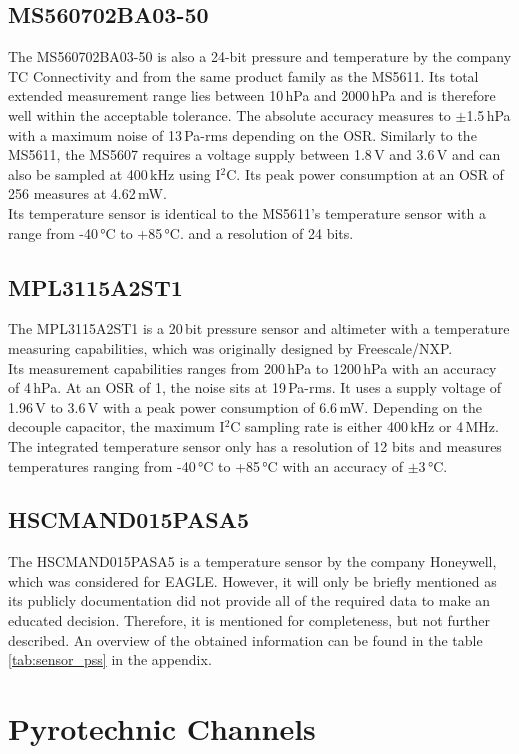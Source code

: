 \documentclass[fontsize=11pt,%
twoside,%
BCOR          = 8mm, %
DIV           = 11,  %
titlepage     = off,%
index=totoc,%
xcolor        = pdftex,%
dvipsnames,%
bibliography  = totoc,%
bibliography = numbered, %
listof        = notnumbered]{scrreprt}
\begin{document}
\subsection{MS560702BA03-50}
The MS560702BA03-50 is also a 24-bit pressure and temperature by the company TC Connectivity and from the same product family as the MS5611. Its total extended measurement range lies between 10\,hPa and 2000\,hPa and is therefore well within the acceptable tolerance. The absolute accuracy measures to $\pm$1.5\,hPa with a maximum noise of 13\,Pa-rms depending on the OSR. Similarly to the MS5611, the MS5607 requires a voltage supply between 1.8\,V and 3.6\,V and can also be sampled at 400\,kHz using I$^2$C. Its peak power consumption at an OSR of 256 measures at 4.62\,mW.\\
Its temperature sensor is identical to the MS5611's temperature sensor with a range from -40\,°C to +85\,°C. and a resolution of 24 bits.

\subsection{MPL3115A2ST1}
The MPL3115A2ST1 is a 20\,bit pressure sensor and altimeter with a temperature measuring capabilities, which was originally designed by Freescale/NXP.\\
Its measurement capabilities ranges from 200\,hPa to 1200\,hPa with an accuracy of 4\,hPa. At an OSR of 1, the noise sits at 19\,Pa-rms. It uses a supply voltage of 1.96\,V to 3.6\,V with a peak power consumption of 6.6\,mW. Depending on the decouple capacitor, the maximum I$^2$C sampling rate is either 400\,kHz or 4\,MHz.\\
The integrated temperature sensor only has a resolution of 12 bits and measures temperatures ranging from -40\,°C to +85\,°C with an accuracy of $\pm$3\,°C.

\subsection{HSCMAND015PASA5}
The HSCMAND015PASA5 is a temperature sensor by the company Honeywell, which was considered for EAGLE. However, it will only be briefly mentioned as its publicly documentation did not provide all of the required data to make an educated decision. Therefore, it is mentioned for completeness, but not further described. An overview of the obtained information can be found in the table \ref{tab:sensor_pss} in the appendix.

\section{Pyrotechnic Channels}
\end{document}
